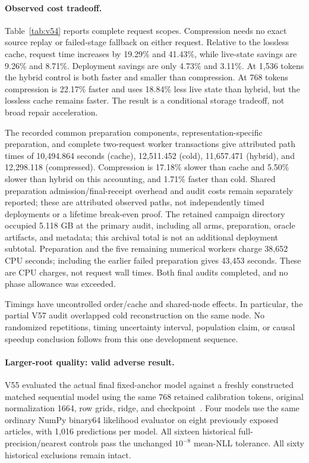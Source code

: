 \documentclass[10pt,twocolumn,letterpaper]{article}
\begin{document}
\paragraph{Observed cost tradeoff.}
Table~\ref{tab:v54} reports complete request scopes. Compression needs no exact
source replay or failed-stage fallback on either request. Relative to the
lossless cache, request time increases by 19.29\% and 41.43\%, while live-state
savings are 9.26\% and 8.71\%. Deployment savings are only 4.73\% and 3.11\%.
At 1,536 tokens the hybrid control is both faster and smaller than compression.
At 768 tokens compression is 22.17\% faster and uses 18.84\% less live state
than hybrid, but the lossless cache remains faster. The result is a conditional
storage tradeoff, not broad repair acceleration.

The recorded common preparation components, representation-specific preparation,
and complete two-request worker transactions give attributed path times of
10,494.864 seconds (cache), 12,511.452 (cold), 11,657.471 (hybrid), and
12,298.118 (compressed). Compression is 17.18\% slower than cache and 5.50\%
slower than hybrid on this accounting, and 1.71\% faster than cold. Shared
preparation admission/final-receipt overhead and audit costs remain separately
reported; these are attributed observed paths, not independently timed
deployments or a lifetime break-even proof. The retained campaign directory
occupied 5.118 GB at the primary audit, including all arms, preparation, oracle
artifacts, and metadata; this archival total is not an additional deployment
subtotal. Preparation and the five remaining
numerical workers charge 38,652 CPU seconds; including the earlier failed
preparation gives 43,453 seconds. These are CPU charges, not request wall times.
Both final audits completed, and no phase allowance was exceeded.

Timings have uncontrolled order/cache and shared-node effects. In particular,
the partial V57 audit overlapped cold reconstruction on the same node. No
randomized repetitions, timing uncertainty interval, population claim, or
causal speedup conclusion follows from this one development sequence.

\paragraph{Larger-root quality: valid adverse result.}
V55 evaluated the actual final fixed-anchor model against a freshly constructed
matched sequential model using the same 768 retained calibration tokens,
original normalization 1664, row grids, ridge, and checkpoint~\cite{v56plan,v58terminal}.
Four models use the same ordinary NumPy binary64 likelihood evaluator on eight
previously exposed articles, with 1,016 predictions per model. All sixteen
historical full-precision/nearest controls pass the unchanged $10^{-8}$
mean-NLL tolerance. All sixty historical exclusions remain intact.
\end{document}
